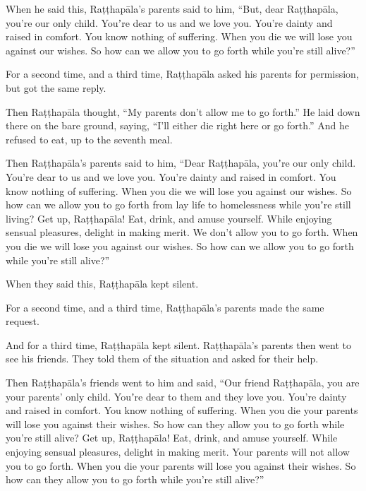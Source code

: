 \documentclass[12pt,openany]{book}%
\begin{document}
When he said this, \textsanskrit{Raṭṭhapāla}’s parents said to him, “But, dear \textsanskrit{Raṭṭhapāla}, you’re our only child. Youʼre dear to us and we love you. You’re dainty and raised in comfort. You know nothing of suffering. When you die we will lose you against our wishes. So how can we allow you to go forth while you’re still alive?” 

For a second time, and a third time, \textsanskrit{Raṭṭhapāla} asked his parents for permission, but got the same reply. 

Then \textsanskrit{Raṭṭhapāla} thought, “My parents don’t allow me to go forth.” He laid down there on the bare ground, saying, “I’ll either die right here or go forth.” And he refused to eat, up to the seventh meal. 

Then \textsanskrit{Raṭṭhapāla}’s parents said to him, “Dear \textsanskrit{Raṭṭhapāla}, youʼre our only child. You’re dear to us and we love you. You’re dainty and raised in comfort. You know nothing of suffering. When you die we will lose you against our wishes. So how can we allow you to go forth from lay life to homelessness while youʼre still living? Get up, \textsanskrit{Raṭṭhapāla}! Eat, drink, and amuse yourself. While enjoying sensual pleasures, delight in making merit. We don’t allow you to go forth. When you die we will lose you against our wishes. So how can we allow you to go forth while you’re still alive?” 

When they said this, \textsanskrit{Raṭṭhapāla} kept silent. 

For a second time, and a third time, \textsanskrit{Raṭṭhapāla}’s parents made the same request. 

And for a third time, \textsanskrit{Raṭṭhapāla} kept silent. \textsanskrit{Raṭṭhapāla}’s parents then went to see his friends. They told them of the situation and asked for their help. 

Then \textsanskrit{Raṭṭhapāla}’s friends went to him and said, “Our friend \textsanskrit{Raṭṭhapāla}, you are your parents’ only child. Youʼre dear to them and they love you. You’re dainty and raised in comfort. You know nothing of suffering. When you die your parents will lose you against their wishes. So how can they allow you to go forth while you’re still alive? Get up, \textsanskrit{Raṭṭhapāla}! Eat, drink, and amuse yourself. While enjoying sensual pleasures, delight in making merit. Your parents will not allow you to go forth. When you die your parents will lose you against their wishes. So how can they allow you to go forth while you’re still alive?” 
\end{document}
